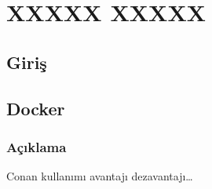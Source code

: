 \documentclass[
]{book}
\begin{document}
\hypertarget{part-xxxxx-xxxxx}{%
\part{XXXXX XXXXX}\label{part-xxxxx-xxxxx}}

\hypertarget{giriux15f-3}{%
\chapter*{Giriş}\label{giriux15f-3}}

\hypertarget{docker}{%
\chapter*{Docker}\label{docker}}

\hypertarget{auxe7ux131klama-11}{%
\section*{Açıklama}\label{auxe7ux131klama-11}}

Conan kullanımı avantajı dezavantajı\ldots{}
\end{document}
